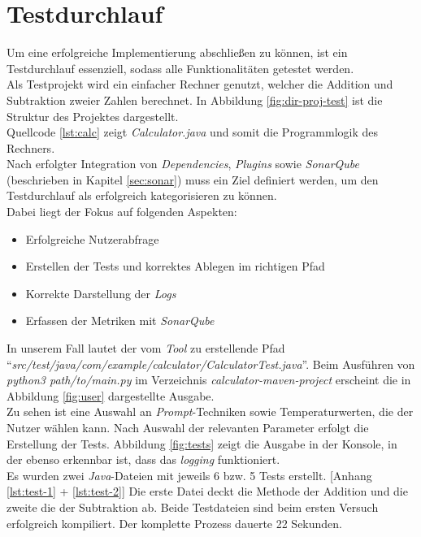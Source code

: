 \section{Testdurchlauf}
Um eine erfolgreiche Implementierung abschließen zu können, ist ein Testdurchlauf essenziell, sodass alle Funktionalitäten getestet werden.\\ Als Testprojekt wird ein einfacher Rechner genutzt, welcher die Addition und Subtraktion zweier Zahlen berechnet. In Abbildung \ref{fig:dir-proj-test} ist die Struktur des Projektes dargestellt.\\
Quellcode \ref{lst:calc} zeigt \textit{Calculator.java} und somit die Programmlogik des Rechners.\\
Nach erfolgter Integration von \textit{Dependencies}, \textit{Plugins} sowie \textit{SonarQube} (beschrieben in Kapitel \ref{sec:sonar}) muss ein Ziel definiert werden, um den Testdurchlauf als erfolgreich kategorisieren zu können. \\
\vspace{-.3cm}
Dabei liegt der Fokus auf folgenden Aspekten:
\begin{itemize}
    \setlength{\parskip}{1pt}
    \item Erfolgreiche Nutzerabfrage
    \item Erstellen der Tests und korrektes Ablegen im richtigen Pfad
    \item Korrekte Darstellung der \textit{Logs}
    \item Erfassen der Metriken mit \textit{SonarQube}
\end{itemize}
In unserem Fall lautet der vom \textit{Tool} zu erstellende Pfad ``\textit{src/test/java/com/example/calculator/CalculatorTest.java}''.
Beim Ausführen von \textit{python3 path/to/main.py} im Verzeichnis \textit{calculator-maven-project} erscheint die in Abbildung \ref{fig:user} dargestellte Ausgabe.
\\
Zu sehen ist eine Auswahl an \textit{Prompt}-Techniken sowie Temperaturwerten, die der Nutzer wählen kann.
Nach Auswahl der relevanten Parameter erfolgt die Erstellung der Tests. Abbildung \ref{fig:tests} zeigt die Ausgabe in der Konsole, in der ebenso erkennbar ist, dass das \textit{logging} funktioniert. \\Es wurden zwei \textit{Java}-Dateien mit jeweils 6 bzw. 5 Tests erstellt. [Anhang \ref{lst:test-1} + \ref{lst:test-2}] Die erste Datei deckt die Methode der Addition und die zweite die der Subtraktion ab. Beide Testdateien sind beim ersten Versuch erfolgreich kompiliert. Der komplette Prozess dauerte 22 Sekunden.
